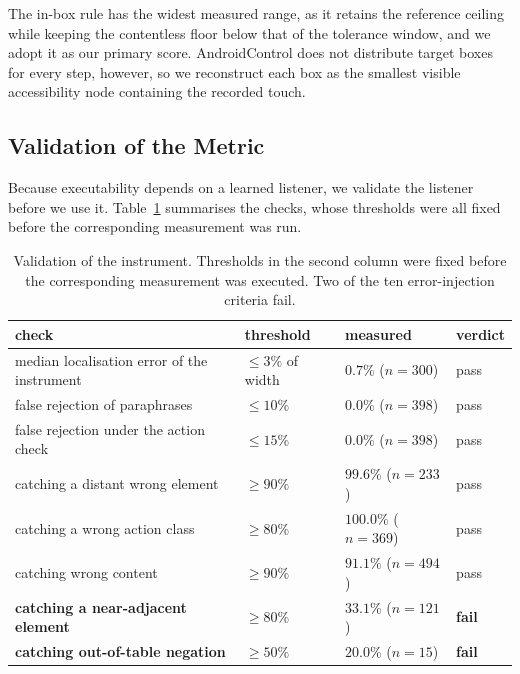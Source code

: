\documentclass[runningheads,a4paper]{llncs}
\begin{document}
The in-box rule has the widest measured range, as it retains the reference ceiling while keeping
the contentless floor below that of the tolerance window, and we adopt it as our primary score.
AndroidControl does not distribute target boxes for every step, however, so we
reconstruct each box as the smallest visible accessibility node containing the recorded touch.

\subsection{Validation of the Metric}
\label{sec:validate}

Because executability depends on a learned listener, we validate the listener before we use it.
Table~\ref{tab:valid} summarises the checks, whose thresholds were all fixed before the
corresponding measurement was run.

\begin{table}[t]
\centering
\caption{Validation of the instrument. Thresholds in the second column were fixed before the
corresponding measurement was executed. Two of the ten error-injection criteria fail.}
\label{tab:valid}
\setlength{\tabcolsep}{4pt}
\begin{tabular}{p{4.6cm}p{1.7cm}p{3.3cm}l}
\toprule
check & threshold & measured & verdict\\
\midrule
median localisation error of the instrument & $\le 3\%$ of width & $0.7\%$ ($n=300$) & pass\\
false rejection of paraphrases & $\le 10\%$ & $0.0\%$ ($n=398$) & pass\\
false rejection under the action check & $\le 15\%$ & $0.0\%$ ($n=398$) & pass\\
catching a distant wrong element & $\ge 90\%$ & $99.6\%$ ($n=233$) & pass\\
catching a wrong action class & $\ge 80\%$ & $100.0\%$ ($n=369$) & pass\\
catching wrong content & $\ge 90\%$ & $91.1\%$ ($n=494$) & pass\\
\textbf{catching a near-adjacent element} & $\ge 80\%$ & $33.1\%$ ($n=121$) & \textbf{fail}\\
\textbf{catching out-of-table negation} & $\ge 50\%$ & $20.0\%$ ($n=15$) & \textbf{fail}\\
\bottomrule
\end{tabular}
\end{table}
\end{document}
